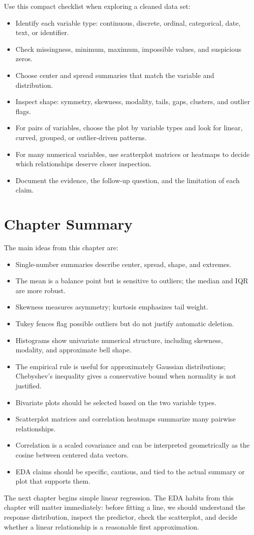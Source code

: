 {Use this compact checklist when exploring a cleaned data set:
\begin{itemize}
  \item Identify each variable type: continuous, discrete, ordinal, categorical, date, text, or identifier.
  \item Check missingness, minimum, maximum, impossible values, and suspicious zeros.
  \item Choose center and spread summaries that match the variable and distribution.
  \item Inspect shape: symmetry, skewness, modality, tails, gaps, clusters, and outlier flags.
  \item For pairs of variables, choose the plot by variable types and look for linear, curved, grouped, or outlier-driven patterns.
  \item For many numerical variables, use scatterplot matrices or heatmaps to decide which relationships deserve closer inspection.
  \item Document the evidence, the follow-up question, and the limitation of each claim.
\end{itemize}

\section{Chapter Summary}

The main ideas from this chapter are:
\begin{itemize}
  \item Single-number summaries describe center, spread, shape, and extremes.
  \item The mean is a balance point but is sensitive to outliers; the median and IQR are more robust.
  \item Skewness measures asymmetry; kurtosis emphasizes tail weight.
  \item Tukey fences flag possible outliers but do not justify automatic deletion.
  \item Histograms show univariate numerical structure, including skewness, modality, and approximate bell shape.
  \item The empirical rule is useful for approximately Gaussian distributions; Chebyshev's inequality gives a conservative bound when normality is not justified.
  \item Bivariate plots should be selected based on the two variable types.
  \item Scatterplot matrices and correlation heatmaps summarize many pairwise relationships.
  \item Correlation is a scaled covariance and can be interpreted geometrically as the cosine between centered data vectors.
  \item EDA claims should be specific, cautious, and tied to the actual summary or plot that supports them.
\end{itemize}

The next chapter begins simple linear regression.  The EDA habits from this chapter will matter immediately: before fitting a line, we should understand the response distribution, inspect the predictor, check the scatterplot, and decide whether a linear relationship is a reasonable first approximation.
}
